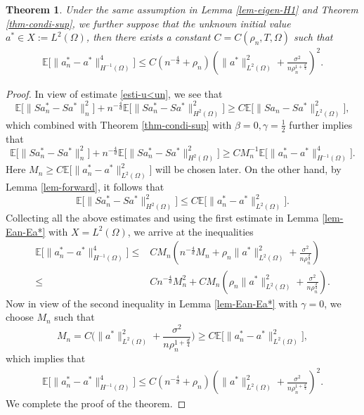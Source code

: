 \documentclass[11pt]{article}
\newtheorem{theorem}{Theorem}
\numberwithin{equation}{section}
\begin{document}
\begin{theorem}\label{thm-E'-condi}
Under the same assumption in Lemma \ref{lem-eigen-H1} and Theorem \ref{thm-condi-sup},   we further suppose that the unknown initial value $a^*\in X :=L^2(\Omega)$, then there exists a constant $C=C(\rho_n,T,\Omega)$ such that
\[
\begin{aligned}
\mathbb{E} \bigl[ \| a_n^* - a^* \|^4_{H^{-1}(\Omega)} \bigr]
\le   C \left( n^{-\frac4d} + \rho_n \right) \left(\| a^* \|^2_{L^2(\Omega)} +  \frac{\sigma^2}{n \rho_n^{1+\frac{d}4}}\right)^2.
\end{aligned}
\]
\end{theorem}
\begin{proof}
In view of estimate \eqref{esti-u<un}, we see that
\[
\mathbb{E} \bigl[ \| S a_n^* - S a^* \|^2_n \bigr] + n^{-\frac4d} \mathbb{E} \bigl[ \| S a_n^* - S a^* \|^2_{H^2(\Omega)} \bigr] \geq C \mathbb{E} \bigl[ \| S a_n - S a^* \|^2_{L^2(\Omega)} \bigr],
\]
which combined with Theorem \ref{thm-condi-sup} with $\beta=0,\gamma=\frac12$ further implies that
\[
\mathbb{E} \bigl[ \| S a_n^* - S a^* \|^2_n \bigr] + n^{-\frac4d}\mathbb{E} \bigl[ \| S a_n^* - S a^* \|^2_{H^2(\Omega)} \bigr] \geq C M_n^{-1} \mathbb{E} \bigl[ \| a_n^* - a^* \|^4_{H^{-1}(\Omega)} \bigr].
\]
Here $M_n\ge C\mathbb{E} \bigl[ \|a_n^* - a^*\|_{L^2(\Omega)}^2\bigr]$ will be chosen later. On the other hand, by Lemma \ref{lem-forward}, it follows that
\[
\mathbb{E} \bigl[ \| S a_n^* - S a^* \|^2_{H^2(\Omega)} \bigr] \leq C \mathbb{E} \bigl[\|a_n^* - a^* \|^2_{L^2(\Omega)} \bigr].
\]
Collecting all the above estimates and using the first estimate in Lemma \ref{lem-Ean-Ea*} with $X=L^2(\Omega)$, we arrive at the inequalities
\[
\begin{aligned}
\mathbb{E} \bigl[ \| a_n^* - a^* \|^4_{H^{-1}(\Omega)} \bigr]
\le& C M_n \left(n^{-\frac4d}M_n +  \rho_n \| a^* \|^2_{L^2(\Omega)} +  \frac{\sigma^2}{n \rho_n^{\frac{d}4}}\right)\\
\le & C n^{-\frac4d}M_n^2 +  CM_n\left(\rho_n \| a^* \|^2_{L^2(\Omega)} +  \frac{\sigma^2}{n \rho_n^{\frac{d}4}}\right).
\end{aligned}
\]
Now in view of the second inequality in Lemma \ref{lem-Ean-Ea*} with $\gamma=0$, we choose $M_n$ such that
$$
M_n=  C\bigg(\| a^* \|^2_{L^2(\Omega)} +  \frac{\sigma^2}{n \rho_n^{1 + \frac{d}4}}\bigg)
\ge C \mathbb{E} \bigl[ \|a_n^* - a^*\|_{L^2(\Omega)}^2\bigr],
$$
which implies that
\[
\begin{aligned}
\mathbb{E} \bigl[ \| a_n^* - a^* \|^4_{H^{-1}(\Omega)} \bigr]
\le  C \left( n^{-\frac4d} + \rho_n \right) \left(\| a^* \|^2_{L^2(\Omega)} +  \frac{\sigma^2}{n \rho_n^{1+\frac{d}4}}\right)^2.
\end{aligned}
\]
We complete the proof of the theorem.
\end{proof}
\end{document}
